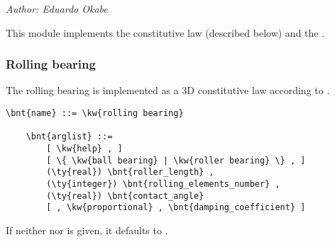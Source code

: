 % 
% 
% 
% 
% 
% 
% 
% 
% 
\emph{Author: Eduardo Okabe}

\noindent
This module implements the  constitutive law (described below) and the .

\subsubsection{Rolling bearing}
\label{sec:MODULES:CL:ROLLING-BEARING}

The rolling bearing is implemented as a 3D constitutive law according to \cite{HAMBRIC-2013-JVA}.
\begin{Verbatim}[commandchars=\\\{\}]
    \bnt{name} ::= \kw{rolling bearing}

    \bnt{arglist} ::=
        [ \kw{help} , ]
        [ \{ \kw{ball bearing} | \kw{roller bearing} \} , ]
        (\ty{real}) \bnt{roller_length} ,
        (\ty{integer}) \bnt{rolling_elements_number} ,
        (\ty{real}) \bnt{contact_angle}
        [ , \kw{proportional} , \bnt{damping_coefficient} ]
\end{Verbatim}
If neither  nor  is given, it defaults to .
